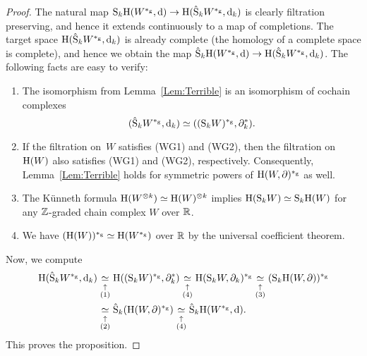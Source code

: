 \documentclass[\MainFolder/Text.tex]{subfiles}
\begin{document}
\begin{proof}
The natural map $\mathrm{S}_k \mathrm{H}(W^{*_{\mathrm{g}}},\mathrm{d}) \rightarrow \mathrm{H}(\hat{\mathrm{S}}_k W^{*_{\mathrm{g}}},\mathrm{d}_k)$ is clearly filtration preserving, and hence it extends continuously to a map of completions. The target space $\mathrm{H}(\hat{\mathrm{S}}_k W^{*_{\mathrm{g}}},\mathrm{d}_k)$ is already complete (the homology of a complete space is complete), and hence we obtain the map $\hat{\mathrm{S}}_k \mathrm{H}(W^{*_{\mathrm{g}}},\mathrm{d}) \rightarrow \mathrm{H}(\hat{\mathrm{S}}_k W^{*_{\mathrm{g}}},\mathrm{d}_k)$. The following facts are easy to verify:
\begin{enumerate}[label=(\arabic*)]
 \item The isomorphism from Lemma~\ref{Lem:Terrible} is an isomorphism of cochain complexes 
 \[ (\hat{\mathrm{S}}_k W^{*_{\mathrm{g}}}, \mathrm{d}_k) \simeq ((\mathrm{S}_k W)^{*_{\mathrm{g}}}, \partial_k^*). \]
\item If the filtration on~$W$ satisfies (WG1) and (WG2), then the filtration on $\mathrm{H}(W)$ also satisfies (WG1) and (WG2), respectively. Consequently, Lemma~\ref{Lem:Terrible} holds for symmetric powers of $\mathrm{H}(W,\partial)^{*_{\mathrm{g}}}$ as well.
\item The Künneth formula $\mathrm{H}(W^{\otimes k}) \simeq \mathrm{H}(W)^{\otimes k}$ implies $\mathrm{H}(\mathrm{S}_k W) \simeq \mathrm{S}_k \mathrm{H}(W)$ for any $\mathbb{Z}$-graded chain complex $W$ over $\mathbb{R}$.
\item We have $(\mathrm{H}(W))^{*_{\mathrm{g}}} \simeq \mathrm{H}(W^{*_{\mathrm{g}}})$ over $\mathbb{R}$ by the universal coefficient theorem.
\end{enumerate}
Now, we compute
\begin{align*}
\H(\hat{\Sym}_k W^{\GD},\Dd_k ) &
\underset{\substack{\uparrow\rule{0pt}{1.5ex} \\ (1)}}{\simeq}
\H((\Sym_k W)^{\GD}, \Bdd_k^*)
\underset{\substack{\uparrow\rule{0pt}{1.5ex} \\ (4)}}{\simeq}
\H(\Sym_k W, \Bdd_k)^{\GD} 
\underset{\substack{\uparrow\rule{0pt}{1.5ex} \\ (3)}}{\simeq}
(\Sym_k \H(W,\Bdd))^{\GD} \\ 
&\underset{\substack{\uparrow\rule{0pt}{1.5ex} \\ (2)}}{\simeq}
\hat{\Sym}_k (\H(W,\Bdd)^{\GD}) 
\underset{\substack{\uparrow\rule{0pt}{1.5ex} \\ (4)}}{\simeq}
\hat{\Sym}_k \H(W^{\GD},\Dd).
\end{align*}
This proves the proposition.
\end{proof}
\end{document}

